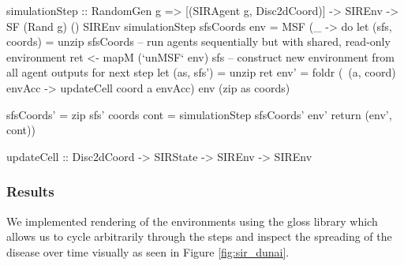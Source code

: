 \begin{HaskellCode}
simulationStep :: RandomGen g => [(SIRAgent g, Disc2dCoord)]
               -> SIREnv -> SF (Rand g) () SIREnv
simulationStep sfsCoords env = MSF (\_ -> do
  let (sfs, coords) = unzip sfsCoords 
  -- run agents sequentially but with shared, read-only environment
  ret <- mapM (`unMSF` env) sfs
  -- construct new environment from all agent outputs for next step
  let (as, sfs') = unzip ret
      env' = foldr (\ (a, coord) envAcc -> updateCell coord a envAcc) 
               env (zip as coords)

      sfsCoords' = zip sfs' coords
      cont       = simulationStep sfsCoords' env'
  return (env', cont))
 
updateCell :: Disc2dCoord -> SIRState -> SIREnv -> SIREnv
\end{HaskellCode}

\subsubsection{Results}
We implemented rendering of the environments using the gloss library which allows us to cycle arbitrarily through the steps and inspect the spreading of the disease over time visually as seen in Figure \ref{fig:sir_dunai}.

